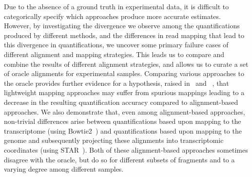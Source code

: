 Due to the absence of a ground truth in experimental data, it is 
difficult to categorically specify which approaches produce more accurate estimates.
However, by investigating the divergence we observe
among the quantifications produced by different methods, and the differences
in read mapping that lead to this divergence in quantifications, we uncover
some primary failure cases of different alignment and mapping strategies. This
leads us to compare and combine the results of different alignment strategies,
and allows us to curate a set of oracle alignments for experimental samples.
  Comparing various approaches to the oracle provides further evidence for a
  hypothesis, raised in~\citet{selaln} and ~\citet{heraem}, that lightweight
  mapping approaches may suffer from spurious mappings leading to a decrease in
  the resulting quantification accuracy compared to alignment-based approaches.
  We also demonstrate that, even among alignment-based approaches, non-trivial
  differences arise between quantifications based upon mapping to the
  transcriptome (using Bowtie2~\citep{bowtie2}) and quantifications based upon
  mapping to the genome and subsequently projecting these alignments into
  transcriptomic coordinates (using STAR~\citep{star}). Both of these
  alignment-based approaches sometimes disagree with the oracle, but do so for
  different subsets of fragments and to a varying degree among different
  samples. 
  

